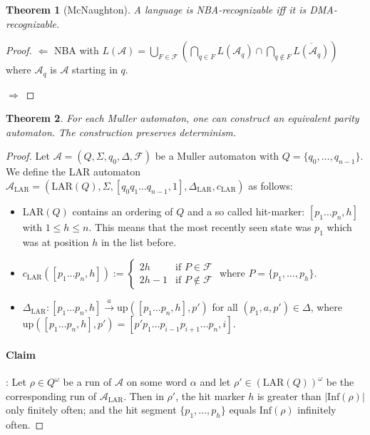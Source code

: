 \documentclass{article}
\newtheorem{theorem}{Theorem}
\begin{document}
\vspace{1cm}
\begin{theorem}[McNaughton]
\label{nba_dma}
	A language is NBA-recognizable iff it is DMA-recognizable.
\end{theorem}
\begin{proof}
	$\bm{\Leftarrow}$ NBA with $L(\mathcal{A}) = \bigcup\limits_{F \in \mathcal{F}} \left( \bigcap\limits_{q \in F} L(\mathcal{A}_q) \cap \bigcap\limits_{q \notin F} \overline{L(\mathcal{A}_q)} \right)$ where $\mathcal{A}_q$ is $\mathcal{A}$ starting in $q$.
	
    $\bm{\Rightarrow}$ %
\end{proof}


\vspace{1cm}
\begin{theorem}
\label{muller_to_parity}
	For each Muller automaton, one can construct an equivalent parity automaton. The construction preserves determinism.
\end{theorem}
\begin{proof}
	Let $\mathcal{A} = (Q, \Sigma, q_0, \Delta, \mathcal{F})$ be a Muller automaton with $Q = \{q_0, \dots, q_{n-1}\}$. We define the LAR automaton $\mathcal{A}_\text{LAR} = (\text{LAR}(Q), \Sigma, [q_0 q_1 \dots q_{n-1}, 1], \Delta_\text{LAR}, c_\text{LAR})$ as follows:
	\begin{itemize}
		\item $\text{LAR}(Q)$ contains an ordering of $Q$ and a so called hit-marker: $[p_1 \dots p_n, h]$ with $1 \leq h \leq n$. This means that the most recently seen state was $p_1$ which was at position $h$ in the list before.
		\item $c_\text{LAR}([p_1 \dots p_n, h]) := \begin{cases}
			2h & \text{if } P \in \mathcal{F} \\
			2h-1 & \text{if } P \notin \mathcal{F}
		\end{cases}$ where $P = \{p_1, \dots, p_h\}$.
		\item $\Delta_\text{LAR} : [p_1 \dots p_n, h] \overset{a}{\rightarrow} \text{up}([p_1 \dots p_n, h], p')$ for all $(p_1, a, p') \in \Delta$, where $\text{up}([p_1 \dots p_n, h], p') = [p' p_1 \dots p_{i-1} p_{i+1} \dots p_n, i]$.
	\end{itemize}
	
	\paragraph{Claim}: Let $\rho \in Q^\omega$ be a run of $\mathcal{A}$ on some word $\alpha$ and let $\rho' \in (\text{LAR}(Q))^\omega$ be the corresponding run of $\mathcal{A}_\text{LAR}$. Then in $\rho'$, the hit marker $h$ is greater than $|\text{Inf}(\rho)|$ only finitely often; and the hit segment $\{p_1, \dots, p_h\}$ equals $\text{Inf}(\rho)$ infinitely often.
\end{proof}
\end{document}
